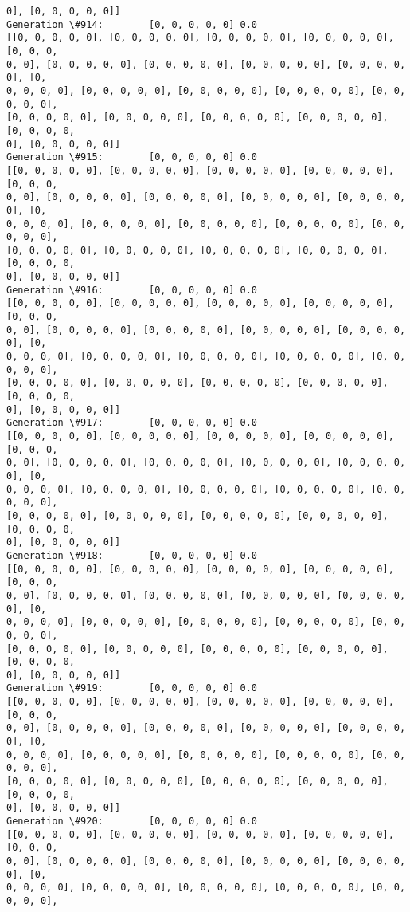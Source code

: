 \documentclass[11pt]{article}
\begin{document}
\begin{Verbatim}[commandchars=\\\{\}]
0], [0, 0, 0, 0, 0]]
Generation \#914:        [0, 0, 0, 0, 0] 0.0
[[0, 0, 0, 0, 0], [0, 0, 0, 0, 0], [0, 0, 0, 0, 0], [0, 0, 0, 0, 0], [0, 0, 0,
0, 0], [0, 0, 0, 0, 0], [0, 0, 0, 0, 0], [0, 0, 0, 0, 0], [0, 0, 0, 0, 0], [0,
0, 0, 0, 0], [0, 0, 0, 0, 0], [0, 0, 0, 0, 0], [0, 0, 0, 0, 0], [0, 0, 0, 0, 0],
[0, 0, 0, 0, 0], [0, 0, 0, 0, 0], [0, 0, 0, 0, 0], [0, 0, 0, 0, 0], [0, 0, 0, 0,
0], [0, 0, 0, 0, 0]]
Generation \#915:        [0, 0, 0, 0, 0] 0.0
[[0, 0, 0, 0, 0], [0, 0, 0, 0, 0], [0, 0, 0, 0, 0], [0, 0, 0, 0, 0], [0, 0, 0,
0, 0], [0, 0, 0, 0, 0], [0, 0, 0, 0, 0], [0, 0, 0, 0, 0], [0, 0, 0, 0, 0], [0,
0, 0, 0, 0], [0, 0, 0, 0, 0], [0, 0, 0, 0, 0], [0, 0, 0, 0, 0], [0, 0, 0, 0, 0],
[0, 0, 0, 0, 0], [0, 0, 0, 0, 0], [0, 0, 0, 0, 0], [0, 0, 0, 0, 0], [0, 0, 0, 0,
0], [0, 0, 0, 0, 0]]
Generation \#916:        [0, 0, 0, 0, 0] 0.0
[[0, 0, 0, 0, 0], [0, 0, 0, 0, 0], [0, 0, 0, 0, 0], [0, 0, 0, 0, 0], [0, 0, 0,
0, 0], [0, 0, 0, 0, 0], [0, 0, 0, 0, 0], [0, 0, 0, 0, 0], [0, 0, 0, 0, 0], [0,
0, 0, 0, 0], [0, 0, 0, 0, 0], [0, 0, 0, 0, 0], [0, 0, 0, 0, 0], [0, 0, 0, 0, 0],
[0, 0, 0, 0, 0], [0, 0, 0, 0, 0], [0, 0, 0, 0, 0], [0, 0, 0, 0, 0], [0, 0, 0, 0,
0], [0, 0, 0, 0, 0]]
Generation \#917:        [0, 0, 0, 0, 0] 0.0
[[0, 0, 0, 0, 0], [0, 0, 0, 0, 0], [0, 0, 0, 0, 0], [0, 0, 0, 0, 0], [0, 0, 0,
0, 0], [0, 0, 0, 0, 0], [0, 0, 0, 0, 0], [0, 0, 0, 0, 0], [0, 0, 0, 0, 0], [0,
0, 0, 0, 0], [0, 0, 0, 0, 0], [0, 0, 0, 0, 0], [0, 0, 0, 0, 0], [0, 0, 0, 0, 0],
[0, 0, 0, 0, 0], [0, 0, 0, 0, 0], [0, 0, 0, 0, 0], [0, 0, 0, 0, 0], [0, 0, 0, 0,
0], [0, 0, 0, 0, 0]]
Generation \#918:        [0, 0, 0, 0, 0] 0.0
[[0, 0, 0, 0, 0], [0, 0, 0, 0, 0], [0, 0, 0, 0, 0], [0, 0, 0, 0, 0], [0, 0, 0,
0, 0], [0, 0, 0, 0, 0], [0, 0, 0, 0, 0], [0, 0, 0, 0, 0], [0, 0, 0, 0, 0], [0,
0, 0, 0, 0], [0, 0, 0, 0, 0], [0, 0, 0, 0, 0], [0, 0, 0, 0, 0], [0, 0, 0, 0, 0],
[0, 0, 0, 0, 0], [0, 0, 0, 0, 0], [0, 0, 0, 0, 0], [0, 0, 0, 0, 0], [0, 0, 0, 0,
0], [0, 0, 0, 0, 0]]
Generation \#919:        [0, 0, 0, 0, 0] 0.0
[[0, 0, 0, 0, 0], [0, 0, 0, 0, 0], [0, 0, 0, 0, 0], [0, 0, 0, 0, 0], [0, 0, 0,
0, 0], [0, 0, 0, 0, 0], [0, 0, 0, 0, 0], [0, 0, 0, 0, 0], [0, 0, 0, 0, 0], [0,
0, 0, 0, 0], [0, 0, 0, 0, 0], [0, 0, 0, 0, 0], [0, 0, 0, 0, 0], [0, 0, 0, 0, 0],
[0, 0, 0, 0, 0], [0, 0, 0, 0, 0], [0, 0, 0, 0, 0], [0, 0, 0, 0, 0], [0, 0, 0, 0,
0], [0, 0, 0, 0, 0]]
Generation \#920:        [0, 0, 0, 0, 0] 0.0
[[0, 0, 0, 0, 0], [0, 0, 0, 0, 0], [0, 0, 0, 0, 0], [0, 0, 0, 0, 0], [0, 0, 0,
0, 0], [0, 0, 0, 0, 0], [0, 0, 0, 0, 0], [0, 0, 0, 0, 0], [0, 0, 0, 0, 0], [0,
0, 0, 0, 0], [0, 0, 0, 0, 0], [0, 0, 0, 0, 0], [0, 0, 0, 0, 0], [0, 0, 0, 0, 0],

\end{Verbatim}
\end{document}

